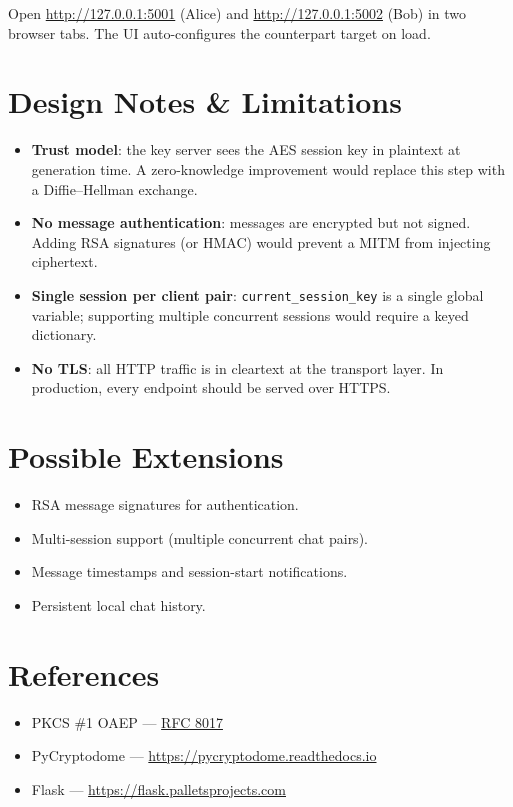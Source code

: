 \documentclass[12pt,a4paper]{article}
\begin{document}
Open \url{http://127.0.0.1:5001} (Alice) and \url{http://127.0.0.1:5002} (Bob) in two browser tabs. The UI auto-configures the counterpart target on load.

\section{Design Notes \& Limitations}

\begin{itemize}
  \item \textbf{Trust model}: the key server sees the AES session key in plaintext at generation time. A zero-knowledge improvement would replace this step with a Diffie–Hellman exchange.
  \item \textbf{No message authentication}: messages are encrypted but not signed. Adding RSA signatures (or HMAC) would prevent a MITM from injecting ciphertext.
  \item \textbf{Single session per client pair}: \texttt{current\_session\_key} is a single global variable; supporting multiple concurrent sessions would require a keyed dictionary.
  \item \textbf{No TLS}: all HTTP traffic is in cleartext at the transport layer. In production, every endpoint should be served over HTTPS.
\end{itemize}

\section{Possible Extensions}

\begin{itemize}
  \item RSA message signatures for authentication.
  \item Multi-session support (multiple concurrent chat pairs).
  \item Message timestamps and session-start notifications.
  \item Persistent local chat history.
\end{itemize}

\section{References}

\begin{itemize}
  \item PKCS \#1 OAEP — \href{https://datatracker.ietf.org/doc/html/rfc8017}{RFC 8017}
  \item PyCryptodome — \url{https://pycryptodome.readthedocs.io}
  \item Flask — \url{https://flask.palletsprojects.com}
\end{itemize}
\end{document}
